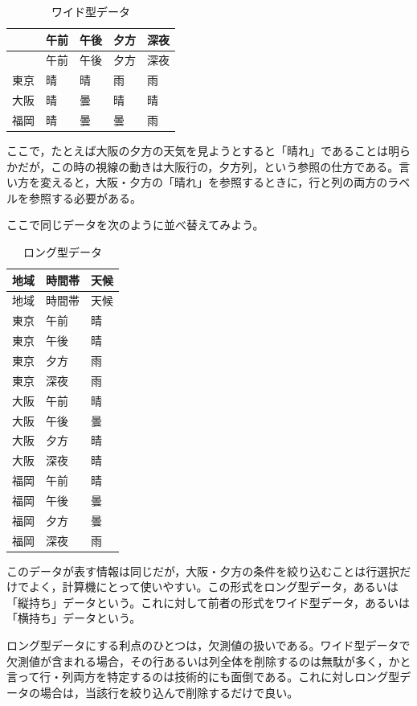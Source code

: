 \documentclass[
  a4paper,
]{ltjsbook}
\begin{document}
\begin{longtable}[]{@{}lllll@{}}
\caption{ワイド型データ}\tabularnewline
\toprule\noalign{}
& 午前 & 午後 & 夕方 & 深夜 \\
\midrule\noalign{}
\endfirsthead
\toprule\noalign{}
& 午前 & 午後 & 夕方 & 深夜 \\
\midrule\noalign{}
\endhead
\bottomrule\noalign{}
\endlastfoot
東京 & 晴 & 晴 & 雨 & 雨 \\
大阪 & 晴 & 曇 & 晴 & 晴 \\
福岡 & 晴 & 曇 & 曇 & 雨 \\
\end{longtable}

ここで，たとえば大阪の夕方の天気を見ようとすると「晴れ」であることは明らかだが，この時の視線の動きは大阪行の，夕方列，という参照の仕方である。言い方を変えると，大阪・夕方の「晴れ」を参照するときに，行と列の両方のラベルを参照する必要がある。

ここで同じデータを次のように並べ替えてみよう。

\begin{longtable}[]{@{}lll@{}}
\caption{ロング型データ}\tabularnewline
\toprule\noalign{}
地域 & 時間帯 & 天候 \\
\midrule\noalign{}
\endfirsthead
\toprule\noalign{}
地域 & 時間帯 & 天候 \\
\midrule\noalign{}
\endhead
\bottomrule\noalign{}
\endlastfoot
東京 & 午前 & 晴 \\
東京 & 午後 & 晴 \\
東京 & 夕方 & 雨 \\
東京 & 深夜 & 雨 \\
大阪 & 午前 & 晴 \\
大阪 & 午後 & 曇 \\
大阪 & 夕方 & 晴 \\
大阪 & 深夜 & 晴 \\
福岡 & 午前 & 晴 \\
福岡 & 午後 & 曇 \\
福岡 & 夕方 & 曇 \\
福岡 & 深夜 & 雨 \\
\end{longtable}

このデータが表す情報は同じだが，大阪・夕方の条件を絞り込むことは行選択だけでよく，計算機にとって使いやすい。この形式をロング型データ，あるいは「縦持ち」データという。これに対して前者の形式をワイド型データ，あるいは「横持ち」データという。

ロング型データにする利点のひとつは，欠測値の扱いである。ワイド型データで欠測値が含まれる場合，その行あるいは列全体を削除するのは無駄が多く，かと言って行・列両方を特定するのは技術的にも面倒である。これに対しロング型データの場合は，当該行を絞り込んで削除するだけで良い。
\end{document}
